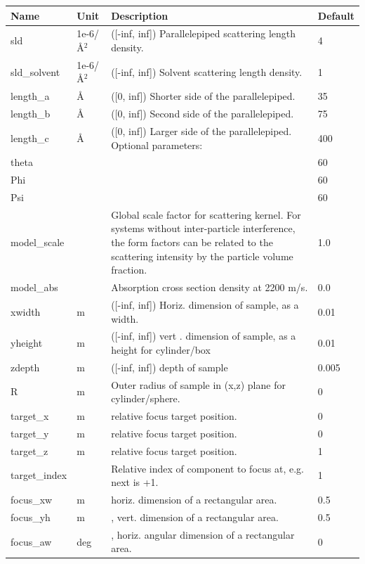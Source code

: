 \begin{longtable}{p{}p{}p{}p{}}
\toprule
\textbf{Name} & \textbf{Unit} & \textbf{Description} & \textbf{Default} \\
\midrule
\endhead
sld & 1e-6/\AA{}$^{2}$ & ([-inf, inf]) Parallelepiped scattering length density. & 4 \\
sld\_solvent & 1e-6/\AA{}$^{2}$ & ([-inf, inf]) Solvent scattering length density. & 1 \\
length\_a & \AA{} & ([0, inf]) Shorter side of the parallelepiped. & 35 \\
length\_b & \AA{} & ([0, inf]) Second side of the parallelepiped. & 75 \\
length\_c & \AA{} & ([0, inf]) Larger side of the parallelepiped. Optional parameters: & 400 \\
theta &  &  & 60 \\
Phi &  &  & 60 \\
Psi &  &  & 60 \\
model\_scale &   & Global scale factor for scattering kernel. For systems without inter-particle interference, the form factors can be related to the scattering intensity by the particle volume fraction. & 1.0 \\
model\_abs &   & Absorption cross section density at 2200 m/s. & 0.0 \\
xwidth & m & ([-inf, inf]) Horiz. dimension of sample, as a width. & 0.01 \\
yheight & m & ([-inf, inf]) vert . dimension of sample, as a height for cylinder/box & 0.01 \\
zdepth & m & ([-inf, inf]) depth of sample & 0.005 \\
R & m & Outer radius of sample in (x,z) plane for cylinder/sphere. & 0 \\
target\_x & m & relative focus target position. & 0 \\
target\_y & m & relative focus target position. & 0 \\
target\_z & m & relative focus target position. & 1 \\
target\_index &   & Relative index of component to focus at, e.g. next is +1. & 1 \\
focus\_xw & m & horiz. dimension of a rectangular area. & 0.5 \\
focus\_yh & m & , vert. dimension of a rectangular area. & 0.5 \\
focus\_aw & deg & , horiz. angular dimension of a rectangular area. & 0 \\

\end{longtable}
